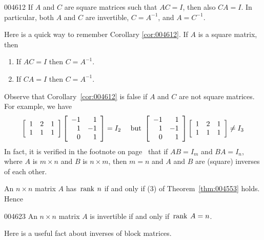 \setcounter{CorollaryCounter}{0} 
\begin{corollary}{}{004612}
If $A$ and $C$ are square matrices such that $AC = I$, then also $CA = I$. In particular, both $A$ and $C$ are invertible, $C = A^{-1}$, and $A = C^{-1}$.
\end{corollary}

Here is a quick way to remember Corollary \ref{cor:004612}. If $A$ is a square matrix, then 
\begin{enumerate}
\item If $AC=I$ then $C=A^{-1}$.
\item If $CA=I$ then $C=A^{-1}$.
\end{enumerate}

\noindent Observe that Corollary~\ref{cor:004612} is false if $A$ and $C$ are not square matrices. For example, we have
\begin{equation*}
\left[ \begin{array}{rrr}
1 & 2 & 1 \\
1 & 1 & 1
\end{array} \right] \left[ \begin{array}{rr}
-1 & 1 \\
1 & -1 \\
0 & 1
\end{array} \right] = I_{2} \quad \mbox{ but } 
\left[ \begin{array}{rr}
-1 & 1 \\
1 & -1 \\
0 & 1
\end{array} \right] \left[ \begin{array}{rrr}
1 & 2 & 1 \\
1 & 1 & 1
\end{array} \right] \neq I_{3}
\end{equation*}
In fact, it is verified in the footnote on page~\pageref{fn:inversematrices} that if $AB = I_{m}$ and $BA = I_{n}$, where $A$ is $m \times n$ and $B$ is $n \times m$, then $m = n$ and $A$ and $B$ are (square) inverses of each other.


An $n \times n$ matrix $A$ has $\thinspace\operatorname{rank \medspace}n$ if and only if (3) of Theorem~\ref{thm:004553} holds. Hence


\begin{corollary}{}{004623}
An $n \times n$ matrix $A$ is invertible if and only if $\thinspace\operatorname{rank \medspace}A = n$.
\end{corollary}

Here is a useful fact about inverses of block matrices.


